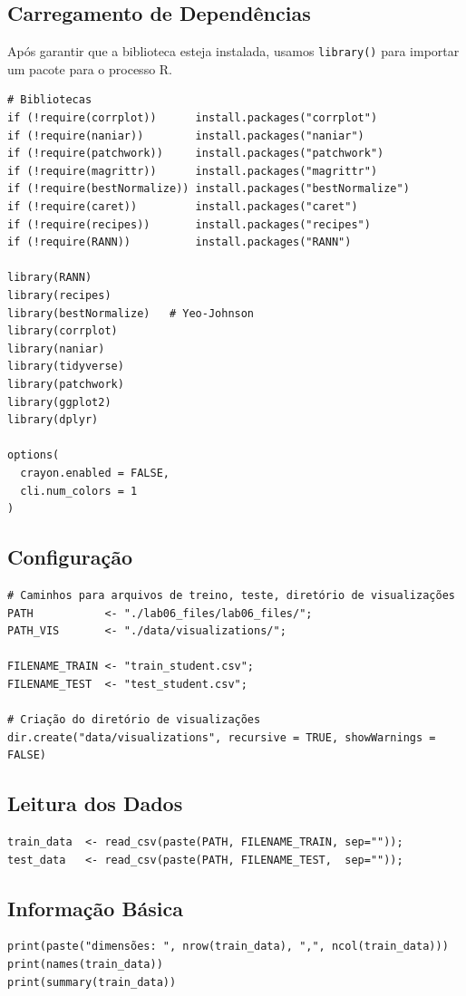 \documentclass[12pt,a4paper]{article}
\begin{document}
\subsection{Carregamento de Dependências}
\label{sec:org231e12f}
Após garantir que a biblioteca esteja instalada, usamos \texttt{library()} para importar um pacote para o processo R.
\begin{verbatim}
# Bibliotecas
if (!require(corrplot))      install.packages("corrplot")
if (!require(naniar))        install.packages("naniar")
if (!require(patchwork))     install.packages("patchwork")
if (!require(magrittr))      install.packages("magrittr")
if (!require(bestNormalize)) install.packages("bestNormalize")
if (!require(caret))         install.packages("caret")
if (!require(recipes))       install.packages("recipes")
if (!require(RANN))          install.packages("RANN")

library(RANN)
library(recipes)
library(bestNormalize)   # Yeo-Johnson
library(corrplot)
library(naniar)
library(tidyverse)
library(patchwork)
library(ggplot2)
library(dplyr)

options(
  crayon.enabled = FALSE,
  cli.num_colors = 1
)
\end{verbatim}
\subsection{Configuração}
\label{sec:orga799154}
\begin{verbatim}
# Caminhos para arquivos de treino, teste, diretório de visualizações
PATH           <- "./lab06_files/lab06_files/";
PATH_VIS       <- "./data/visualizations/";

FILENAME_TRAIN <- "train_student.csv";
FILENAME_TEST  <- "test_student.csv";

# Criação do diretório de visualizações
dir.create("data/visualizations", recursive = TRUE, showWarnings = FALSE)
\end{verbatim}
\subsection{Leitura dos Dados}
\label{sec:org92560cd}
\begin{verbatim}
train_data  <- read_csv(paste(PATH, FILENAME_TRAIN, sep=""));
test_data   <- read_csv(paste(PATH, FILENAME_TEST,  sep=""));
\end{verbatim}
\subsection{Informação Básica}
\label{sec:org85ca4b8}
\begin{verbatim}
print(paste("dimensões: ", nrow(train_data), ",", ncol(train_data)))
print(names(train_data))
print(summary(train_data))
\end{verbatim}
\end{document}
